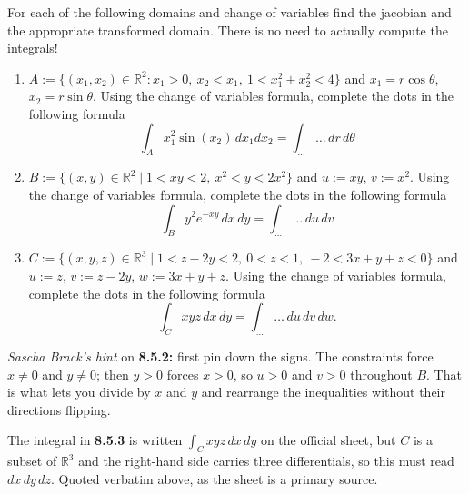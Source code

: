 \begin{exercise}
\label{ex:8.5}
For each of the following domains and change of variables find the jacobian and the appropriate
transformed domain. There is no need to actually compute the integrals!
\begin{enumerate}[label=\textbf{\arabic*.}]
  \item $A := \{(x_1,x_2) \in \mathbb{R}^2 : x_1 > 0,\ x_2 < x_1,\ 1 < x_1^2+x_2^2 < 4\}$ and
    $x_1 = r\cos\theta$, $x_2 = r\sin\theta$. Using the change of variables formula, complete
    the dots in the following formula
    \[\int_A x_1^2\sin(x_2)\,dx_1dx_2 = \int_{\dots}\dots\,dr\,d\theta\]
  \item $B := \{(x,y) \in \mathbb{R}^2 \mid 1 < xy < 2,\ x^2 < y < 2x^2\}$ and $u := xy$,
    $v := x^2$. Using the change of variables formula, complete the dots in the following
    formula
    \[\int_B y^2e^{-xy}\,dx\,dy = \int_{\dots}\dots\,du\,dv\]
  \item $C := \{(x,y,z) \in \mathbb{R}^3 \mid 1 < z-2y < 2,\ 0 < z < 1,\ -2 < 3x+y+z < 0\}$ and
    $u := z$, $v := z-2y$, $w := 3x+y+z$. Using the change of variables formula, complete the
    dots in the following formula
    \[\int_C xyz\,dx\,dy = \int_{\dots}\dots\,du\,dv\,dw.\]
\end{enumerate}

\textit{Sascha Brack's hint} on \textbf{8.5.2:} first pin down the signs. The constraints force
$x \neq 0$ and $y \neq 0$; then $y > 0$ forces $x > 0$, so $u > 0$ and $v > 0$ throughout $B$.
That is what lets you divide by $x$ and $y$ and rearrange the inequalities without their
directions flipping.
\end{exercise}

\begin{ainote}
The integral in \textbf{8.5.3} is written $\int_C xyz\,dx\,dy$ on the official sheet, but $C$ is
a subset of $\mathbb{R}^3$ and the right-hand side carries three differentials, so this must
read $dx\,dy\,dz$. Quoted verbatim above, as the sheet is a primary source.
\end{ainote}


